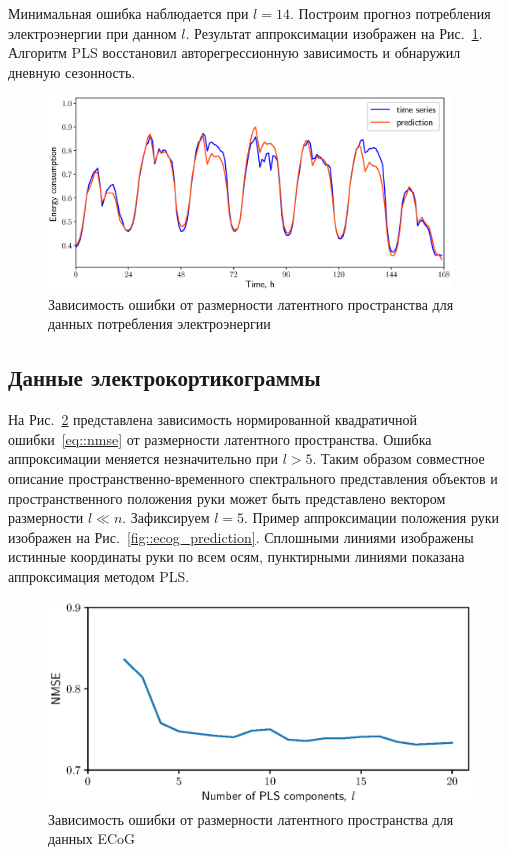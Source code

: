 \documentclass[12pt,twoside]{article}
\begin{document}
Минимальная ошибка наблюдается при $l=14$. 
Построим прогноз потребления электроэнергии при данном $l$. 
Результат аппроксимации изображен на Рис.~\ref{fig::energy_prediction}. Алгоритм PLS восстановил авторегрессионную зависимость и обнаружил дневную сезонность.

\begin{figure}[!h]
	\centering
	\includegraphics[width=0.95\textwidth]{figs/energy_prediction}
	\caption{Зависимость ошибки от размерности латентного пространства для данных потребления электроэнергии}
	\label{fig::energy_prediction}
\end{figure}

\subsection{Данные электрокортикограммы}

На Рис.~\ref{fig::ecog_n_comp} представлена зависимость нормированной квадратичной ошибки~\eqref{eq::nmse} от размерности латентного пространства. Ошибка аппроксимации меняется незначительно при $l > 5$.
Таким образом совместное описание пространственно-временного спектрального представления объектов и пространственного положения руки может быть представлено вектором размерности $l \ll n$.
Зафиксируем $l = 5$. 
Пример аппроксимации положения руки изображен на Рис.~\ref{fig::ecog_prediction}. 
Сплошными линиями изображены истинные координаты руки по всем осям, пунктирными линиями показана аппроксимация методом PLS.
 
\begin{figure}[!h]
	\centering
	\includegraphics[width=0.75\linewidth]{figs/ecog_n_comp}	
	\caption{Зависимость ошибки от размерности латентного пространства для данных ECoG}
	\label{fig::ecog_n_comp}
\end{figure}
\end{document}
